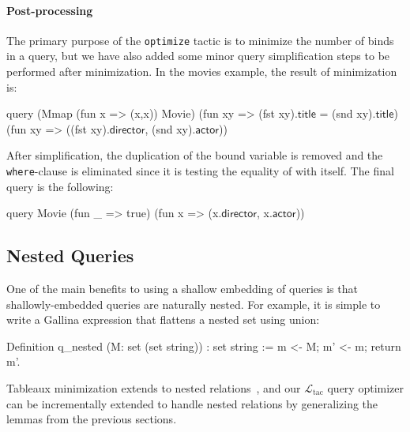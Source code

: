 \documentclass[preprint]{sigplanconf}
\newcommand{\ltac}[0]{\ensuremath{\mathcal{L}_{\mathrm{tac}}}}
\begin{document}
\paragraph{Post-processing}
The primary purpose of the {\tt optimize} tactic is to minimize the number of binds in a query, but we have also added some minor query simplification steps to be performed after minimization.  In the movies example, the result of minimization is:
\begin{coq}
query (Mmap (fun x => (x,x)) Movie)
      (fun xy => (fst xy).$\textsf{title}$ = (snd xy).$\textsf{title}$)
      (fun xy => ((fst xy).$\textsf{director}$, (snd xy).$\textsf{actor}$))
\end{coq}
After simplification, the duplication of the bound variable is removed and the {\tt where}-clause is eliminated since it is testing the equality of  with itself.  The final query is the following:
\begin{coq}
query Movie (fun _ => true) (fun x => (x.$\textsf{director}$, x.$\textsf{actor}$))
\end{coq}

\subsection{Nested Queries}

One of the main benefits to using a shallow embedding of queries is that shallowly-embedded queries are naturally nested.  For example, it is simple to write a Gallina expression that flattens a nested set using union:
\begin{coq}
Definition q_nested (M: set (set string)) : set string :=
  m <- M;
  m' <- m;
  return m'.
\end{coq}
Tableaux minimization extends to nested relations~\cite{popa99equational}, and our \ltac{} query optimizer can be incrementally extended to handle nested relations by generalizing the lemmas from the previous sections. %

\end{document}
